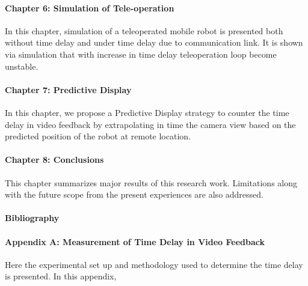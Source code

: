 \paragraph*{Chapter 6: Simulation of Tele-operation \\}

In this chapter, simulation of a teleoperated mobile robot is presented both without time delay and  under time delay due to communication link. It is shown via simulation that with increase in time delay  teleoperation loop become unstable. 
 
\paragraph*{Chapter 7: Predictive Display \\}
In this chapter,  we propose a Predictive Display strategy to counter the time delay in video feedback by extrapolating in time  the camera view based on the predicted position of the robot at remote location. 

\paragraph*{Chapter 8: Conclusions\\}
This chapter summarizes major results of this research work. Limitations along with the future scope from the present experiences are also addressed.


\paragraph*{Bibliography}
\paragraph*{Appendix A:  Measurement of Time Delay in Video Feedback  \\}
Here the experimental set up and methodology used to determine the time delay is presented.
In this appendix, 
